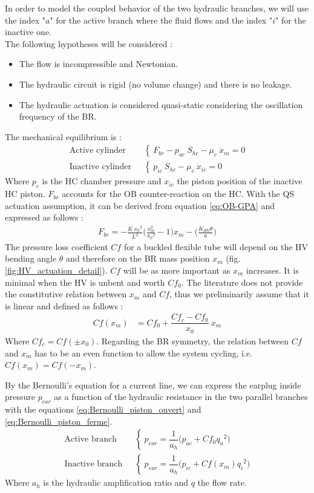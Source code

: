 \documentclass[3p,twocolumn,preprint]{elsarticle}
\begin{document}
In order to model the coupled behavior of the two hydraulic branches, we will use the index "$a$" for the active branch where the fluid flows and the index "$i$" for the inactive one. \\
The following hypotheses will be considered :
\begin{itemize}
	\item The flow is incompressible and Newtonian.
	\item The hydraulic circuit is rigid (no volume change) and there is no leakage.
	\item The hydraulic actuation is considered quasi-static considering the oscillation frequency of the BR.
\end{itemize}
The mechanical equilibrium is :
\begin{align}
	\text{Active cylinder ~}& \left\{~
	F_{br} - p_{ac}\ S_{hc} - \mu_{c}\ \dot{x}_m = 0
	\right.
	\label{eq:equilibre_dynamique_piston_ouvert}\\
	\text{Inactive cylinder ~}& \left\{~
	p_{ic}\ S_{hc} - \mu_{c}\ \dot{x}_{ic} = 0
	\right.
	\label{eq:equilibre_dynamique_piston_ferme}
\end{align}
Where $p_c$ is the HC chamber pressure and $x_{ic}$ the piston position of the inactive HC piston. $F_{br}$ accounts for the OB counter-reaction on the HC. With the QS actuation assumption, it can be derived from equation \ref{eq:OB-GPA} and expressed as follows : 
\begin{align}
	F_{br} = -\frac{K\ {x_0}^2}{L^2}\biggl(\frac{x_m^2}{{x_0}^2} -1\biggr)x_m - \biggl( \frac{K_{HV}\theta}{a} \biggr)
	\label{eq:F_OB_xxxxxx}
\end{align}
The pressure loss coefficient $Cf$ for a buckled flexible tube will depend on the HV bending angle $\theta$ and therefore on the BR mass position $x_m$ (fig. \ref{fig:HV_actuation_detail}). $Cf$ will be as more important as $x_m$ increases. It is minimal when the HV is unbent and worth $Cf_0$. The literature does not provide the constitutive relation between $x_m$ and $Cf$, thus we preliminarily assume that it is linear and defined as follows :
\begin{align}
Cf(x_m) & = Cf_0 + \dfrac{Cf_c - Cf_0}{x_0}\ x_m 
\label{eq:Cf(x_m)_linear}
\end{align}
Where $Cf_c=Cf(\pm x_0)$. Regarding the BR symmetry, the relation between $Cf$ and $x_m$ has to be an even function to allow the system cycling, i.e. $Cf(x_m) = Cf(-x_m)$.

By the Bernoulli's equation for a current line, we can express the earplug inside pressure $p_{ear}$ as a function of the hydraulic resistance in the two parallel branches with the equations \ref{eq:Bernoulli_piston_ouvert} and \ref{eq:Bernoulli_piston_ferme}.
\begin{align}
	\text{Active branch ~}& \left\{~
	p_{ear} = \dfrac{1}{a_h}\biggl(p_{ac} + Cf_0 {q_a}^2 \biggr)
	\right.
	\label{eq:Bernoulli_piston_ouvert}\\
	\text{Inactive branch ~}& \left\{~
	p_{ear} = \dfrac{1}{a_h}\biggl(p_{ic} + Cf(x_m) {q_i}^2 \biggr)
	\right.
	\label{eq:Bernoulli_piston_ferme}
\end{align}
Where $a_h$ is the hydraulic amplification ratio and $q$ the flow rate.
\end{document}
